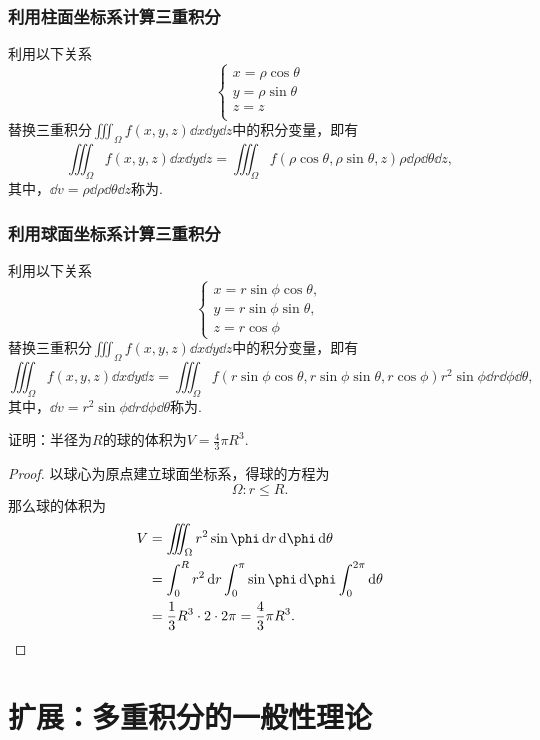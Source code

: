 \subsubsection{利用柱面坐标系计算三重积分}
利用以下关系\[
\left\{ \begin{array}{l}
x = \rho\cos\theta \\
y = \rho\sin\theta \\
z = z \\
\end{array} \right.
\]替换三重积分\(\iiint_{\Omega}{f(x,y,z)\dd{x}\dd{y}\dd{z}}\)中的积分变量，即有\[
\iiint_{\Omega}{f(x,y,z)\dd{x}\dd{y}\dd{z}}
= \iiint_{\Omega}{f(\rho \cos\theta,\rho \sin\theta,z) \rho \dd{\rho} \dd{\theta} \dd{z}},
\]其中，\(\dd{v} = \rho \dd{\rho} \dd{\theta} \dd{z}\)称为.

\subsubsection{利用球面坐标系计算三重积分}
利用以下关系\[
\left\{ \begin{array}{l}
x = r \sin\phi \cos\theta, \\
y = r \sin\phi \sin\theta, \\
z = r \cos\phi
\end{array} \right.
\]替换三重积分\(\iiint_{\Omega}{f(x,y,z)\dd{x}\dd{y}\dd{z}}\)中的积分变量，即有\[
\iiint_{\Omega}{f(x,y,z)\dd{x}\dd{y}\dd{z}}
= \iiint_{\Omega}{f(r \sin\phi \cos\theta,r \sin\phi \sin\theta,r \cos\phi) r^2 \sin\phi \dd{r} \dd{\phi} \dd{\theta}},
\]其中，\(\dd{v} = r^2 \sin\phi \dd{r} \dd{\phi} \dd{\theta}\)称为.

\begin{example}
证明：半径为\(R\)的球的体积为\(V = \frac{4}{3} \pi R^3\).
\begin{proof}
以球心为原点建立球面坐标系，得球的方程为\[
\Omega: r \leq R.
\]那么球的体积为\begin{align*}
V &= \iiint_{\Omega} r^2 \sin\phi \dd{r} \dd{\phi} \dd{\theta} \\
&= \int_0^R r^2 \dd{r} \int_0^\pi \sin\phi \dd{\phi} \int_0^{2\pi} \dd{\theta} \\
&= \frac{1}{3} R^3 \cdot 2 \cdot 2\pi
= \frac{4}{3} \pi R^3.
\qedhere
\end{align*}
\end{proof}
\end{example}

\section{扩展：多重积分的一般性理论}
